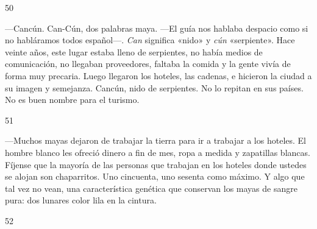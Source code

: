 \documentclass[12pt,twoside,openright,a5paper]{book}
\begin{document}
\hrulefill \hspace{0.1cm}\decofourleft\hspace{0.2cm} 50 \hspace{0.2cm}\decofourright \hspace{0.1cm}\hrulefill

\nopagebreak

\vspace{0.5cm}

\nopagebreak

---Cancún. Can-Cún, dos palabras maya. ---El guía nos
hablaba despacio como si no habláramos todos español---. \emph{Can} significa «nido»
y \emph{cún} «serpiente». Hace veinte años, este lugar estaba lleno de serpientes,
no había medios de comunicación, no llegaban proveedores, faltaba la
comida y la gente vivía de forma muy precaria. Luego llegaron los hoteles,
las cadenas, e hicieron la ciudad a su imagen y semejanza. Cancún, nido de
serpientes. No lo repitan en sus países. No es buen nombre para el turismo.

\vspace{0.5cm}

\hrulefill \hspace{0.1cm}\decofourleft\hspace{0.2cm} 51 \hspace{0.2cm}\decofourright \hspace{0.1cm}\hrulefill

\nopagebreak

\vspace{0.5cm}

\nopagebreak

---Muchos mayas dejaron de trabajar la tierra para ir a trabajar a los
hoteles.  El hombre blanco les ofreció dinero a fin de mes, ropa a medida y
zapatillas blancas.  Fíjense que la mayoría de las personas que trabajan
en los hoteles donde ustedes se alojan son chaparritos. Uno cincuenta, uno
sesenta como máximo. Y algo que tal vez no vean, una característica genética
que conservan los mayas de sangre pura: dos lunares color lila en la cintura.

\vspace{0.5cm}

\hrulefill \hspace{0.1cm}\decofourleft\hspace{0.2cm} 52 \hspace{0.2cm}\decofourright \hspace{0.1cm}\hrulefill
\end{document}
